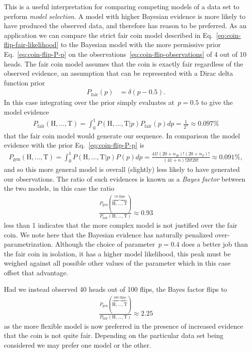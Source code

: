 This is a useful interpretation for comparing competing models of a data set to perform \emph{model selection}. A model with higher Bayesian evidence is more likely to have produced the observed data, and therefore has reason to be preferred. As an application we can compare the strict fair coin model described in Eq.~\eqref{eq:coin-flip-fair-likelihood} to the Bayesian model with the more permissive prior Eq.~\eqref{eq:coin-flip-P-p} on the observations~\eqref{eq:coin-flip-observations} of 4 out of 10 heads. The fair coin model assumes that the coin is exactly fair regardless of the observed evidence, an assumption that can be represented with a Dirac delta function prior \begin{align}
    P_{\text{fair}}(p) &= \delta(p - 0.5).
\end{align}
In this case integrating over the prior simply evaluates at~$p = 0.5$ to give the model evidence \begin{align}
    P_{\text{fair}}(\text{H},...,\text{T}) = \int_0^1 P(\text{H},...,\text{T}|p)P_{\text{fair}}(p) dp = \frac{1}{2^n} \approx 0.097\%
\end{align}
that the fair coin model would generate our sequence. In comparison the model evidence with the prior Eq.~\eqref{eq:coin-flip-P-p} is \begin{align}
    P_{\text{gen}}(\text{H},...,\text{T}) = \int_0^1 P(\text{H},...,\text{T}|p)P(p) dp = \frac{41!(20+n_H)!(20+n_T)!}{(41 + n)!20!20!} \approx 0.091\%,
\end{align}
and so this more general model is overall (slightly) less likely to have generated our observations. The ratio of such evidences is known as a \emph{Bayes factor} between the two models, in this case the ratio \begin{align}
    \frac{P_{\text{gen}}(\overbrace{\text{H},...,\text{T}}^{10 \text{ flips}})}{P_{\text{fair}}(\text{H},...,\text{T})} \approx 0.93
\end{align}
less than 1 indicates that the more complex model is not justified over the fair coin. We note here that the Bayesian evidence has naturally penalized over-parametrization. Although the choice of parameter~$p = 0.4$ does a better job than the fair coin in isolation, it has a higher model likelihood, this peak must be weighed against all possible other values of the parameter which in this case offset that advantage.

Had we instead observed 40 heads out of 100 flips, the Bayes factor flips to \begin{align}
    \frac{P_{\text{gen}}(\overbrace{\text{H},...,\text{T}}^{100 \text{ flips}})}{P_{\text{fair}}(\text{H},...,\text{T})} \approx 2.25 \label{eq:coin-flip-bayes-factor}
\end{align}
as the more flexible model is now preferred in the presence of increased evidence that the coin is not quite fair. Depending on the particular data set being considered we may prefer one model or the other. 

